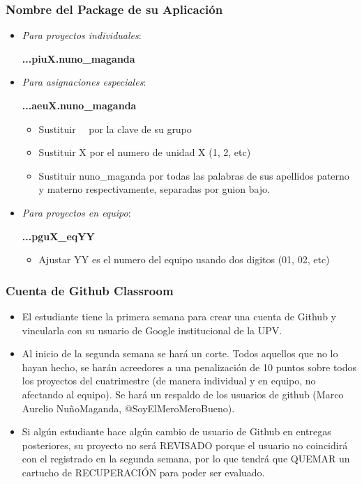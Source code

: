 \begin{frame}
\frametitle{Nombre del Package de su Aplicaci\'on}
\begin{itemize}
\item \textit{Para proyectos individuales}: 

\textbf{\package.\cuatriaberpackage.\clavegrupo.piuX.nuno\_maganda}
\item \textit{Para asignaciones especiales}: 

\textbf{\package.\cuatriaberpackage.\clavegrupo.aeuX.nuno\_maganda}
\begin{itemize}
\item Sustituir \clavegrupo  \ \ por la clave de su grupo
\item Sustituir X por el numero de unidad X (1, 2, etc) 
\item Sustituir nuno\_maganda por todas las palabras de sus apellidos paterno y materno respectivamente, separadas por guion bajo.
\end{itemize}
\item \textit{Para proyectos en equipo}: 


\textbf{\package.\cuatriaberpackage.\clavegrupo.pguX\_eqYY}
\begin{itemize}
\item Ajustar YY es el numero del equipo usando dos digitos (01, 02, etc)
\end{itemize}

\end{itemize}

\end{frame}

\begin{frame}
\frametitle{Cuenta de Github Classroom}
\begin{itemize}
\item El estudiante tiene la primera semana para crear una cuenta de Github y vincularla con su usuario de Google institucional de la UPV.
\item Al inicio de la segunda semana se hará un corte. Todos aquellos que no lo hayan hecho, se harán acreedores a una penalización de 10 puntos sobre todos los proyectos del cuatrimestre (de manera individual y en equipo, no afectando al equipo). Se hará un respaldo de los usuarios de github (Marco Aurelio NuñoMaganda, @SoyElMeroMeroBueno).
\item Si algún estudiante hace algún cambio de usuario de Github en entregas posteriores, su proyecto no será REVISADO porque el usuario no coincidirá con el registrado en la segunda semana, por lo que tendrá que QUEMAR un cartucho de RECUPERACIÓN para poder ser evaluado. 
 
\end{itemize}


\end{frame}

